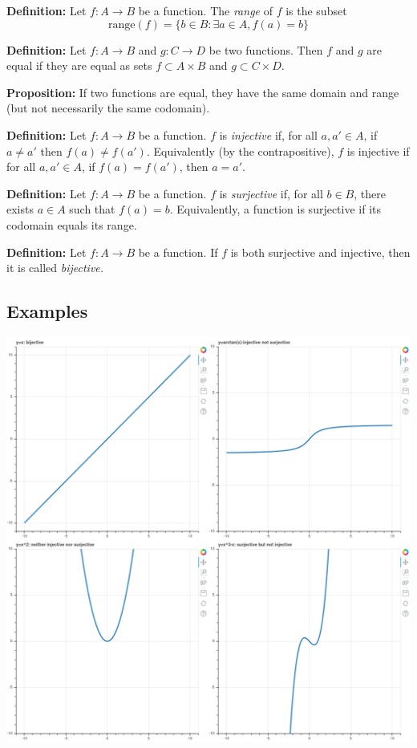 \documentclass[
]{article}
\begin{document}
\textbf{Definition:} Let \(f:A\to B\) be a function. The \emph{range} of
\(f\) is the subset
\[\mathrm{range}(f)=\{b\in B: \exists a\in A, f(a)=b\}\]

\textbf{Definition:} Let \(f:A\to B\) and \(g:C\to D\) be two functions.
Then \(f\) and \(g\) are equal if they are equal as sets
\(f\subset A\times B\) and \(g\subset C\times D\).

\textbf{Proposition:} If two functions are equal, they have the same
domain and range (but not necessarily the same codomain).

\textbf{Definition:} Let \(f:A\to B\) be a function. \(f\) is
\emph{injective} if, for all \(a,a'\in A\), if \(a\not=a'\) then
\(f(a)\not=f(a')\). Equivalently (by the contrapositive), \(f\) is
injective if for all \(a,a'\in A\), if \(f(a)=f(a')\), then \(a=a'\).

\textbf{Definition:} Let \(f:A\to B\) be a function. \(f\) is
\emph{surjective} if, for all \(b\in B\), there exists \(a\in A\) such
that \(f(a)=b\). Equivalently, a function is surjective if its codomain
equals its range.

\textbf{Definition:} Let \(f:A\to B\) be a function. If \(f\) is both
surjective and injective, then it is called \emph{bijective.}

\vfill\eject

\hypertarget{examples}{%
\subsection{Examples}\label{examples}}

\includegraphics[width=1\textwidth,height=\textheight]{../png/injsurjbijexamples.png}

\vfill
\end{document}
